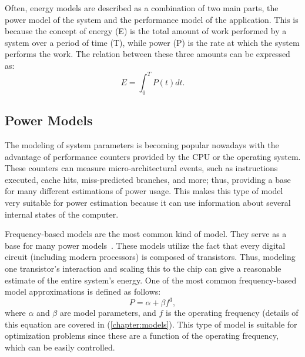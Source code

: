 Often, energy models are described as a combination of two main parts, the power model of the system and the performance model of the application. This is because the concept of energy (E) is the total amount of work performed by a system over a period of time (T), while power (P) is the rate at which the system performs the work. The relation between these three amounts can be expressed as:
\begin{equation}
E = \int_{0}^{T}P(t)dt.
\label{eq:energy_definition_cont}
\end{equation}

\subsection{Power Models} \label{subsec:tb_power_models}

The modeling of system parameters is becoming popular nowadays with the advantage of performance counters provided by the CPU or the operating system. These counters can measure micro-architectural events, such as instructions executed, cache hits, miss-predicted branches, and more; thus, providing a base for many different estimations of power usage. This makes this type of model very suitable for power estimation because it can use information about several internal states of the computer.

Frequency-based models are the most common kind of model. They serve as a base for many power models~\cite{Sarwar1997CmosCalculation, Butzen2007LeakageGates, Usman2013ANoC}. These models utilize the fact that every digital circuit (including modern processors) is composed of transistors. Thus, modeling one transistor's interaction and scaling this to the chip can give a reasonable estimate of the entire system's energy. One of the most common frequency-based %
model approximations is defined as follows: 
\begin{equation}
P = \alpha+\beta f^3,
\label{eq:power_simplified}
\end{equation}
where $\alpha$ and $\beta$ are model parameters, and $f$ is the operating frequency (details of this equation are covered in (\cref{chapter:models}). This type of model is suitable for optimization problems since these are a function of the operating frequency, which can be easily controlled.


